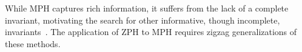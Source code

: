 \documentclass{article}
\theoremstyle{plain}
\theoremstyle{definition}
\theoremstyle{remark}
\newcommand{\Shreyas}[1]		{{ \textcolor{orange} {S: #1}}}
\begin{document}

While MPH captures rich information, it suffers from the lack of a complete invariant, motivating the search for other informative, though incomplete, invariants~\cite{Multipers_landscapes, Multipers_Kernel_Kerber, Carriere_Multipers_Images, diff_signed_barcodes_24, vect_signed_barcodes_23, graphcode, gril23, dgril24}. The application of ZPH to MPH requires zigzag generalizations of these methods. 


\end{document}
